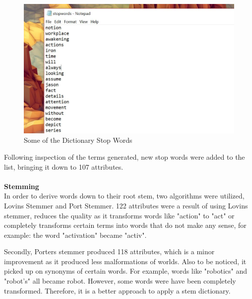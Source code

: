 \begin{figure}[ht]
	\begin{center}
		\advance\leftskip-3cm
		\advance\rightskip-3cm
		\includegraphics[keepaspectratio=true,scale=0.7]{__resources/stop.JPG}
		\caption{Some of the Dictionary Stop Words}
		\label{stop}
	\end{center}
\end{figure}
\newpage
Following inspection of the terms generated, new stop words were added to the list, bringing it down to 107 attributes. \\ \\
\textbf{Stemming}\\
In order to derive words down to their root stem, two algorithms were utilized, Lovins Stemmer and Port Stemmer. 122 attributes were a result of using Lovins stemmer, reduces the quality as it transforms words like "action" to "act" or completely transforms certain terms into words that do not make any sense, for example: the word "activation" became "activ".

Secondly, Porters stemmer produced 118 attributes, which is a minor improvement as it produced less malformations of worlds. Also to be noticed, it picked up on synonyms of certain words. For example, words like "robotics" and "robot's" all became robot. However, some words were have been completely transformed. Therefore, it is a better approach to apply a stem dictionary. 

